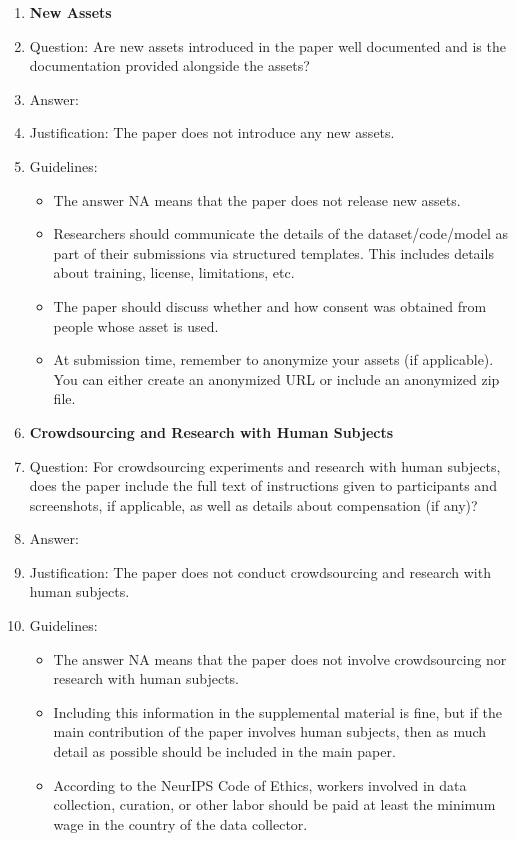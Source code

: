 \documentclass{article}
\begin{document}
\begin{enumerate}
\item {\bf New Assets}
    \item[] Question: Are new assets introduced in the paper well documented and is the documentation provided alongside the assets?
    \item[] Answer: \answerNA{} %
    \item[] Justification: The paper does not introduce any new assets.
    \item[] Guidelines:
    \begin{itemize}
        \item The answer NA means that the paper does not release new assets.
        \item Researchers should communicate the details of the dataset/code/model as part of their submissions via structured templates. This includes details about training, license, limitations, etc.
        \item The paper should discuss whether and how consent was obtained from people whose asset is used.
        \item At submission time, remember to anonymize your assets (if applicable). You can either create an anonymized URL or include an anonymized zip file.
    \end{itemize}

\item {\bf Crowdsourcing and Research with Human Subjects}
    \item[] Question: For crowdsourcing experiments and research with human subjects, does the paper include the full text of instructions given to participants and screenshots, if applicable, as well as details about compensation (if any)?
    \item[] Answer: \answerNA{} %
    \item[] Justification: The paper does not conduct crowdsourcing and research with human subjects.
    \item[] Guidelines:
    \begin{itemize}
        \item The answer NA means that the paper does not involve crowdsourcing nor research with human subjects.
        \item Including this information in the supplemental material is fine, but if the main contribution of the paper involves human subjects, then as much detail as possible should be included in the main paper.
        \item According to the NeurIPS Code of Ethics, workers involved in data collection, curation, or other labor should be paid at least the minimum wage in the country of the data collector.
    \end{itemize}


\end{enumerate}
\end{document}
